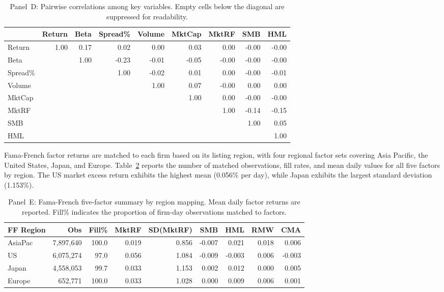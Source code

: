 \documentclass{article}
\theoremstyle{plain}
\begin{document}
\begin{table}[!ht]
\centering
\footnotesize
\setlength{\tabcolsep}{4pt}
\begin{tabular}{lrrrrrrrr}
\toprule
 & \textbf{Return} & \textbf{Beta} & \textbf{Spread\%} & \textbf{Volume} & \textbf{MktCap} & \textbf{MktRF} & \textbf{SMB} & \textbf{HML} \\
\midrule
  Return & 1.00 & 0.17 & 0.02 & 0.00 & 0.03 & 0.00 & -0.00 & -0.00 \\
  Beta &  & 1.00 & -0.23 & -0.01 & -0.05 & -0.00 & -0.00 & -0.00 \\
  Spread\% &  &  & 1.00 & -0.02 & 0.01 & 0.00 & -0.00 & -0.01 \\
  Volume &  &  &  & 1.00 & 0.07 & -0.00 & 0.00 & 0.00 \\
  MktCap &  &  &  &  & 1.00 & 0.00 & -0.00 & -0.00 \\
  MktRF &  &  &  &  &  & 1.00 & -0.14 & -0.15 \\
  SMB &  &  &  &  &  &  & 1.00 & 0.05 \\
  HML &  &  &  &  &  &  &  & 1.00 \\
\bottomrule
\end{tabular}
\caption{Panel~D: Pairwise correlations among key variables. Empty cells below the diagonal are suppressed for readability.}
\label{tab:panel_d}
\end{table}

Fama-French factor returns are matched to each firm based on its listing region, with four regional factor sets covering Asia Pacific, the United States, Japan, and Europe. Table~\ref{tab:panel_e} reports the number of matched observations, fill rates, and mean daily values for all five factors by region. The US market excess return exhibits the highest mean (0.056\% per day), while Japan exhibits the largest standard deviation (1.153\%).

\begin{table}[!ht]
\centering
\footnotesize
\begin{tabular}{l r r r r r r r r}
\toprule
\textbf{FF Region} & \textbf{Obs} & \textbf{Fill\%} & \textbf{MktRF} & \textbf{SD(MktRF)} & \textbf{SMB} & \textbf{HML} & \textbf{RMW} & \textbf{CMA} \\
\midrule
  AsiaPac & 7,897,640 & 100.0 & 0.019 & 0.856 & -0.007 & 0.021 & 0.018 & 0.006 \\
  US & 6,075,274 & 97.0 & 0.056 & 1.084 & -0.009 & -0.003 & 0.006 & -0.003 \\
  Japan & 4,558,053 & 99.7 & 0.033 & 1.153 & 0.002 & 0.012 & 0.000 & 0.005 \\
  Europe & 652,771 & 100.0 & 0.033 & 1.028 & 0.000 & 0.009 & 0.006 & 0.001 \\
\bottomrule
\end{tabular}
\caption{Panel~E: Fama-French five-factor summary by region mapping. Mean daily factor returns are reported. Fill\% indicates the proportion of firm-day observations matched to factors.}
\label{tab:panel_e}
\end{table}
\end{document}
